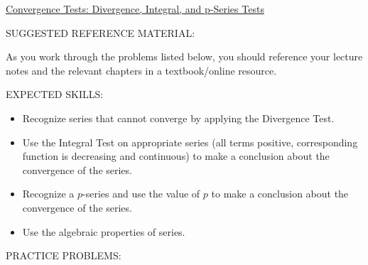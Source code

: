 \documentclass[12pt]{article}
\begin{document}
\begin{center}
\underline{\LARGE{Convergence Tests: Divergence, Integral, and p-Series Tests}}
\end{center}

\noindent SUGGESTED REFERENCE MATERIAL:

\medskip

\noindent As you work through the problems listed below, you should reference your lecture notes and the relevant chapters in a textbook/online resource.

\bigskip

\noindent EXPECTED SKILLS:

\medskip

\begin{itemize}[topsep=0pt]

\item Recognize series that cannot converge by applying the Divergence Test.

\item Use the Integral Test on appropriate series (all terms positive, corresponding function is decreasing and continuous) to make a conclusion about the convergence of the series.

\item Recognize a $p$-series and use the value of $p$ to make a conclusion about the convergence of the series.

\item Use the algebraic properties of series.

\end{itemize}

\bigskip

\noindent PRACTICE PROBLEMS:

\medskip

\end{document}
